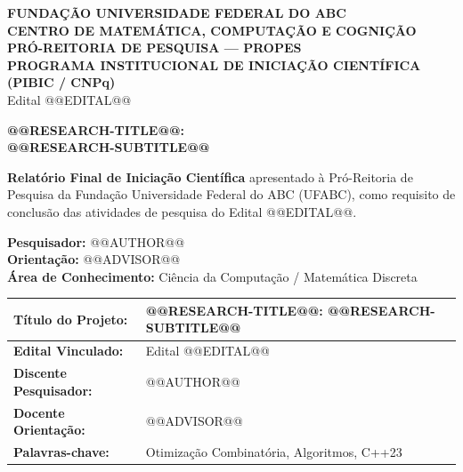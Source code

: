 \thispagestyle{empty}

\begin{center}
    {\large\textbf{FUNDAÇÃO UNIVERSIDADE FEDERAL DO ABC}}\\[0.15cm]
    {\large\textbf{CENTRO DE MATEMÁTICA, COMPUTAÇÃO E COGNIÇÃO}}\\[0.15cm]
    {\textbf{PRÓ-REITORIA DE PESQUISA --- PROPES}}\\[0.1cm]
    {\small\textbf{PROGRAMA INSTITUCIONAL DE INICIAÇÃO CIENTÍFICA (PIBIC / CNPq)}}\\[0.1cm]
    {\footnotesize Edital @@EDITAL@@}
\end{center}

\vspace{1.0cm}

\begin{center}
    {\LARGE\textbf{@@RESEARCH-TITLE@@:}}\\[0.3cm]
    {\Large\textbf{@@RESEARCH-SUBTITLE@@}}\par
\end{center}

\vspace{0.8cm}

\begin{flushright}
\begin{minipage}{0.6\textwidth}
\small
{}
\textbf{Relatório Final de Iniciação Científica} apresentado à Pró-Reitoria de Pesquisa da Fundação Universidade Federal do ABC (UFABC), como requisito de conclusão das atividades de pesquisa do Edital @@EDITAL@@.\par
\vspace{0.3cm}
\textbf{Pesquisador:} @@AUTHOR@@\\
\textbf{Orientação:} @@ADVISOR@@\\
\textbf{Área de Conhecimento:} Ciência da Computação / Matemática Discreta
\end{minipage}
\end{flushright}

\vspace{0.8cm}

\begin{center}
\small
{}
\begin{tabular}{|p{}|>{\raggedright\arraybackslash}p{}|}
\hline
\textbf{Título do Projeto:} & @@RESEARCH-TITLE@@: @@RESEARCH-SUBTITLE@@ \\ \hline
\textbf{Edital Vinculado:} & Edital @@EDITAL@@ \\ \hline
\textbf{Discente Pesquisador:} & @@AUTHOR@@ \\ \hline
\textbf{Docente Orientação:} & @@ADVISOR@@ \\ \hline
\textbf{Palavras-chave:} & Otimização Combinatória, Algoritmos, C++23 \\ \hline
\end{tabular}
\end{center}

